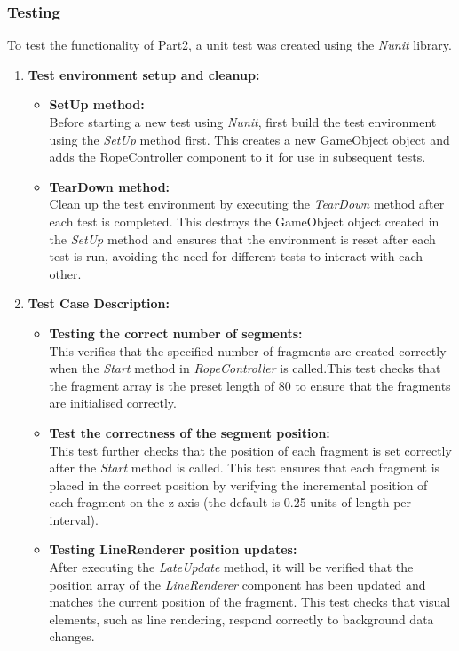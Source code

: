 \documentclass[12pt]{article}
\begin{document}
\subsubsection{Testing}
To test the functionality of Part2, a unit test was created using the \emph{Nunit} library\cite{NUnit2023}.
\begin{enumerate}
      \item \textbf{Test environment setup and cleanup:}
            \begin{itemize}
                  \item \textbf{SetUp method:}
                  \\
                  Before starting a new test using \emph{Nunit}, first build the test environment using the \emph{SetUp } method first. This creates a new GameObject object and adds the RopeController component to it for use in subsequent tests.
                  \item \textbf{TearDown method:}
                  \\
                  Clean up the test environment by executing the \emph{TearDown} method after each test is completed. This destroys the GameObject object created in the \emph{SetUp } method and ensures that the environment is reset after each test is run, avoiding the need for different tests to interact with each other.
            \end{itemize}
            \item \textbf{Test Case Description:}
            \begin{itemize}
                  \item \textbf{Testing the correct number of segments:}
                  \\
                  This verifies that the specified number of fragments are created correctly when the \emph{Start} method in \emph{RopeController} is called.This test checks that the fragment array is the preset length of 80 to ensure that the fragments are initialised correctly.
                  \item \textbf{Test the correctness of the segment position:}
                  \\
                  This test further checks that the position of each fragment is set correctly after the \emph{Start } method is called. This test ensures that each fragment is placed in the correct position by verifying the incremental position of each fragment on the z-axis (the default is 0.25 units of length per interval).
                  \item \textbf{Testing LineRenderer position updates:}
                  \\
                  After executing the \emph{LateUpdate} method, it will be verified that the position array of the \emph{LineRenderer} component has been updated and matches the current position of the fragment. This test checks that visual elements, such as line rendering, respond correctly to background data changes.
            \end{itemize}
      \end{enumerate}
\end{document}
